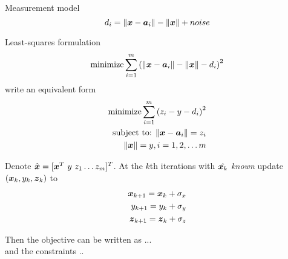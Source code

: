 Measurement model
\begin{equation}
\nonumber
d_i = \|\mbox{\boldmath$x$} - \mbox{\boldmath$a$}_i\| - \|\mbox{\boldmath$x$}\| + noise
\end{equation}

Least-squares formulation
\begin{equation}
\nonumber
\mathop{\mbox{minimize}} \sum^m_{i=1}\left( \|\mbox{\boldmath$x$} - \mbox{\boldmath$a$}_i\| - \|\mbox{\boldmath$x$}\| - d_i\right)^2
\end{equation}
write an equivalent form
\begin{eqnarray}
\nonumber
\mathop{\mbox{minimize}} \sum^m_{i=1}\left( z_i - y - d_i\right)^2\\
\nonumber
\mbox{subject to: } \|\mbox{\boldmath$x$} - \mbox{\boldmath$a$}_i\| = z_i \\
\nonumber
\|\mbox{\boldmath$x$}\| = y, i = 1, 2, \ldots m
\end{eqnarray}

Denote $\hat{\mbox{\boldmath$x$}} = [\mbox{\boldmath$x$}^T \ y \ z_1 \ldots z_m]^T$. At the $k$th iterations with $\hat{\mbox{\boldmath$x$}_k}$ \textit{known} update $(\mbox{\boldmath$x$}_k, y_k, \mbox{\boldmath$z$}_k)$ to 
\begin{eqnarray}
\nonumber
\mbox{\boldmath$x$}_{k+1} = \mbox{\boldmath$x$}_k + \sigma_x \\
\nonumber
y_{k+1} = y_k + \sigma_y \\
\nonumber
\mbox{\boldmath$z$}_{k+1} = \mbox{\boldmath$z$}_k + \sigma_z
\end{eqnarray}

Then the objective can be written as
...\\
and the constraints
..